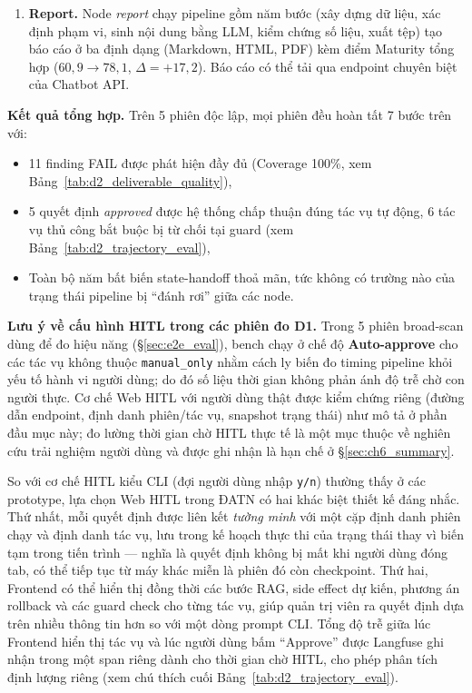\begin{enumerate}
  \item \textbf{Report.} Node \textit{report} chạy pipeline gồm năm bước (xây dựng dữ liệu, xác định phạm vi, sinh nội dung bằng LLM, kiểm chứng số liệu, xuất tệp) tạo báo cáo ở ba định dạng (Markdown, HTML, PDF) kèm điểm Maturity tổng hợp ($60{,}9 \rightarrow 78{,}1$, $\Delta = +17{,}2$). Báo cáo có thể tải qua endpoint chuyên biệt của Chatbot API.
\end{enumerate}

\textbf{Kết quả tổng hợp.} Trên 5 phiên độc lập, mọi phiên đều hoàn tất 7 bước trên với:
\begin{itemize}
  \item 11 finding FAIL được phát hiện đầy đủ (Coverage 100\%, xem Bảng~\ref{tab:d2_deliverable_quality}),
  \item 5 quyết định \emph{approved} được hệ thống chấp thuận đúng tác vụ tự động, 6 tác vụ thủ công bắt buộc bị từ chối tại guard (xem Bảng~\ref{tab:d2_trajectory_eval}),
  \item Toàn bộ năm bất biến state-handoff thoả mãn, tức không có trường nào của trạng thái pipeline bị ``đánh rơi'' giữa các node.
\end{itemize}

\textbf{Lưu ý về cấu hình HITL trong các phiên đo D1.} Trong 5 phiên broad-scan dùng để đo hiệu năng (\S\ref{sec:e2e_eval}), bench chạy ở chế độ \textbf{Auto-approve} cho các tác vụ không thuộc \texttt{manual\_only} nhằm cách ly biến đo timing pipeline khỏi yếu tố hành vi người dùng; do đó số liệu thời gian không phản ánh độ trễ chờ con người thực. Cơ chế Web HITL với người dùng thật được kiểm chứng riêng (đường dẫn endpoint, định danh phiên/tác vụ, snapshot trạng thái) như mô tả ở phần đầu mục này; đo lường thời gian chờ HITL thực tế là một mục thuộc về nghiên cứu trải nghiệm người dùng và được ghi nhận là hạn chế ở \S\ref{sec:ch6_summary}.

So với cơ chế HITL kiểu CLI (đợi người dùng nhập \texttt{y/n}) thường thấy ở các prototype, lựa chọn Web HITL trong ĐATN có hai khác biệt thiết kế đáng nhắc. Thứ nhất, mỗi quyết định được liên kết \emph{tường minh} với một cặp định danh phiên chạy và định danh tác vụ, lưu trong kế hoạch thực thi của trạng thái thay vì biến tạm trong tiến trình --- nghĩa là quyết định không bị mất khi người dùng đóng tab, có thể tiếp tục từ máy khác miễn là phiên đó còn checkpoint. Thứ hai, Frontend có thể hiển thị đồng thời các bước RAG, side effect dự kiến, phương án rollback và các guard check cho từng tác vụ, giúp quản trị viên ra quyết định dựa trên nhiều thông tin hơn so với một dòng prompt CLI. Tổng độ trễ giữa lúc Frontend hiển thị tác vụ và lúc người dùng bấm ``Approve'' được Langfuse ghi nhận trong một span riêng dành cho thời gian chờ HITL, cho phép phân tích định lượng riêng (xem chú thích cuối Bảng~\ref{tab:d2_trajectory_eval}).

